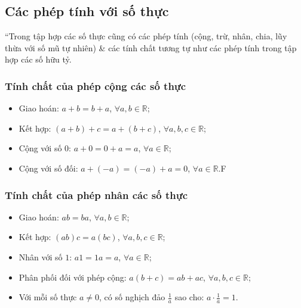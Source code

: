 \documentclass[oneside]{book}
\numberwithin{equation}{section}
\begin{document}
\subsection{Các phép tính với số thực}
``Trong tập hợp các số thực cũng có các phép tính (cộng, trừ, nhân, chia, lũy thừa với số mũ tự nhiên) \& các tính chất tương tự như các phép tính trong tập hợp các số hữu tỷ.

\subsubsection{Tính chất của phép cộng các số thực}
\begin{itemize}
	\item Giao hoán: $a + b = b + a$, $\forall a,b\in\mathbb{R}$;
	\item Kết hợp: $(a + b) + c = a + (b + c)$, $\forall a,b,c\in\mathbb{R}$;
	\item Cộng với số $0$: $a + 0 = 0 + a = a$, $\forall a\in\mathbb{R}$;
	\item Cộng với số đối: $a + (-a) = (-a) + a = 0$, $\forall a\in\mathbb{R}$.F
\end{itemize}

\subsubsection{Tính chất của phép nhân các số thực}
\begin{itemize}
	\item Giao hoán: $ab = ba$, $\forall a,b\in\mathbb{R}$;
	\item Kết hợp: $(ab)c = a(bc)$, $\forall a,b,c\in\mathbb{R}$;
	\item Nhân với số $1$: $a1 = 1a = a$, $\forall a\in\mathbb{R}$;
	\item Phân phối đối với phép cộng: $a(b + c) = ab + ac$, $\forall a,b,c\in\mathbb{R}$;
	\item Với mỗi số thực $a\ne 0$, có số nghịch đảo $\frac{1}{a}$ sao cho: $a\cdot\frac{1}{a} = 1$.
\end{itemize}
\end{document}

